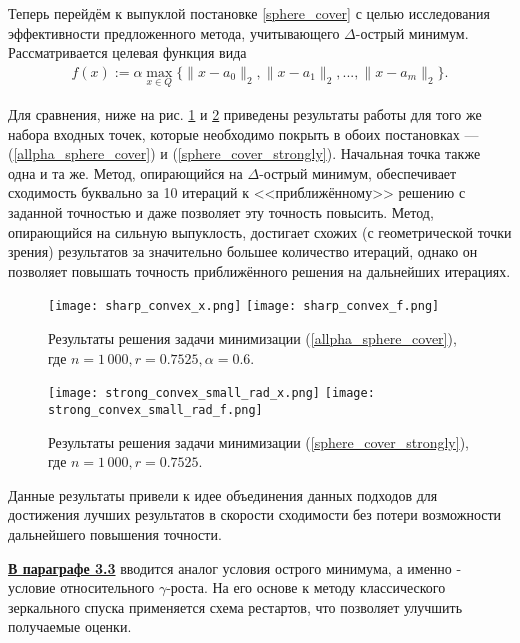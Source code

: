 Теперь перейдём к выпуклой постановке \eqref{sphere_cover} с целью исследования эффективности предложенного метода, учитывающего $\Delta$-острый минимум. Рассматривается целевая функция вида
\begin{gather}\label{allpha_sphere_cover}
    f(x) := \alpha \max_{x\in Q}\{\|x - a_0\|_2, \|x - a_1\|_2, ..., \|x - a_m\|_2\}.
\end{gather}

Для сравнения, ниже на рис. \ref{res_sharp_convex} и \ref{res_strong_convex} приведены результаты работы для того же набора входных точек, которые необходимо покрыть в обоих постановках --- (\ref{allpha_sphere_cover}) и (\ref{sphere_cover_strongly}). Начальная точка также одна и та же. Метод, опирающийся на $\Delta$-острый минимум, обеспечивает сходимость буквально за 10 итераций к <<приближённому>> решению с заданной точностью и даже позволяет эту точность повысить. Метод, опирающийся на сильную выпуклость, достигает схожих (с геометрической точки зрения) результатов за значительно большее количество итераций, однако он позволяет повышать точность приближённого решения на дальнейших итерациях.

\begin{figure}[h]
    \texttt{[image: sharp\_convex\_x.png]}
    \endminipage\hfill
    \texttt{[image: sharp\_convex\_f.png]}
    \endminipage\hfill
    \caption{ Результаты решения задачи минимизации (\ref{allpha_sphere_cover}), где  $n= 1\,000, r = 0.7525, \alpha = 0.6$.}
    \label{res_sharp_convex}
\end{figure}

\begin{figure}[h]
    \texttt{[image: strong\_convex\_small\_rad\_x.png]}
    \endminipage\hfill
    \texttt{[image: strong\_convex\_small\_rad\_f.png]}
    \endminipage\hfill
    \caption{ Результаты решения задачи минимизации (\ref{sphere_cover_strongly}), где  $n= 1\,000, r = 0.7525$.}
    \label{res_strong_convex}
\end{figure}

Данные результаты привели к идее объединения данных подходов для достижения лучших результатов в скорости сходимости без потери возможности дальнейшего повышения точности.


\underline{\textbf{В параграфе 3.3}} вводится аналог условия острого минимума, а именно - условие относительного $\gamma$-роста. На его основе к методу классического зеркального спуска применяется схема рестартов, что позволяет улучшить получаемые оценки.

